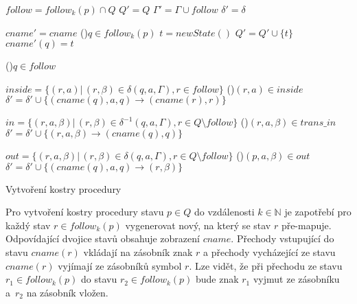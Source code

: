         \begin{algorithm}[h]
            \scriptsize
            \DontPrintSemicolon
            \setcounter{AlgoLine}{0}

            \vspace{0.2cm}
            $follow = follow_k(p) \cap Q$\;
            $Q' = Q$\;
            $\Gamma' = \Gamma \cup follow$\;
            $\delta' = \delta$\;
            \vspace{0.2cm}

            $cname' = cname$\;
            \ForAll(){$q \in follow_k(p)$}
            {
                $t = newState()$ 
                $Q' = Q' \cup \{t\}$\;
                $cname'(q) = t$\;
            }

            \vspace{0.2cm}

            \ForAll(){$q \in follow$}
            {
                $inside = \{(r, a) |\, (r, \beta) \in \delta(q, a, \Gamma), r \in follow\}$\;
                \ForAll(){$(r, a) \in inside$}
                {
                    $\delta' = \delta' \cup \{(cname(q), a, q) \rightarrow (cname(r), r)\}$\;
                }

                $in = \{(r, a, \beta) |\, (r, \beta) \in \delta^{-1}(q, a, \Gamma), r \in Q \setminus follow\}$\;
                \ForAll(){$(r, a, \beta) \in trans\_in$}
                {
                    $\delta' = \delta' \cup \{(r, a, \beta) \rightarrow (cname(q), q)\}$\;
                }

                $out = \{(r, a, \beta) |\, (r, \beta) \in \delta(q, a, \Gamma), r \in Q \setminus follow\}$\;
                \ForAll(){$(p, a, \beta) \in out$}
                {
                    $\delta' = \delta' \cup \{(cname(q), a, q) \rightarrow (r, \beta)\}$\;
                }
            }


            \normalsize
            \caption{Vytvoření kostry procedury}
            \label{mapPrim-Alg}
        \end{algorithm}

        Pro vytvoření kostry procedury stavu $p \in Q$ do vzdálenosti $k \in \mathbb{N}$ je zapotřebí pro každý stav $r \in follow_k(p)$ vygenerovat nový, na který se stav $r$ pře-mapuje. Odpovídající dvojice stavů obsahuje zobrazení $cname$. Přechody vstupující do stavu $cname(r)$ vkládají na zásobník znak $r$ a přechody vycházející ze stavu $cname(r)$ vyjímají ze zásobníků symbol $r$. Lze vidět, že při přechodu ze stavu $r_1 \in follow_k(p)$ do stavu $r_2 \in follow_k(p)$ bude znak $r_1$ vyjmut ze zásobníku a~$r_2$ na zásobník vložen.

